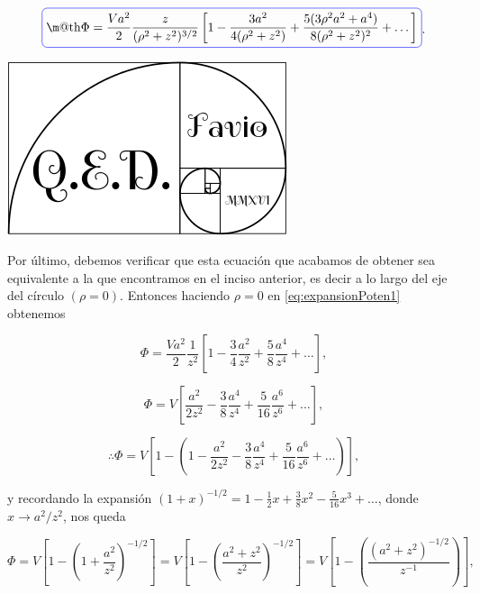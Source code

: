 \documentclass[a4paper,10pt]{article}
\makeatletter
\numberwithin{equation}{section}
\newcommand*{\boxcolor}{blue}
\renewcommand{\boxed}[1]{\textcolor{\boxcolor}{%
\tikz[baseline={([yshift=-1ex]current bounding box.center)}] \node [rectangle, minimum width=1ex,rounded corners,draw] {\normalcolor\m@th$\displaystyle#1$};}}
\makeatother
\begin{document}
\begin{equation}
 \boxed{\Phi = \frac{Va^2}{2}\frac{z}{(\rho^2 + z^2)^{3/2}}\left[1 - 
 \frac{3a^2}{4(\rho^2 + z^2)} + \frac{5(3\rho^2a^2+a^4)}{8(\rho^2 + z^2)^2} 
 + \dots \right]}.
 \label{eq:expansionPoten1}
\end{equation}

\hspace{10cm}\includegraphics[scale=0.2]{logoQED}

Por último, debemos verificar que esta ecuación que acabamos de obtener 
sea equivalente a la que encontramos en el inciso anterior, es decir 
a lo largo del eje del círculo $(\rho = 0)$. Entonces haciendo $\rho = 0$ 
en \eqref{eq:expansionPoten1} obtenemos 

\begin{equation}
 \Phi = \frac{Va^2}{2}\frac{1}{z^2}
 \left[1 - \frac{3}{4}\frac{a^2}{z^2} + 
 \frac{5}{8}\frac{a^4}{z^4} + \dots \right],
\end{equation}

\begin{equation}
 \Phi = V\left[\frac{a^2}{2z^2} - 
 \frac{3}{8}\frac{a^4}{z^4} + 
 \frac{5}{16}\frac{a^6}{z^6} + \dots \right],
\end{equation}

\begin{equation}
 \therefore \Phi = V\left[1 - \left(1 - \frac{a^2}{2z^2} - 
 \frac{3}{8}\frac{a^4}{z^4} + 
 \frac{5}{16}\frac{a^6}{z^6} + \dots  \right) \right],
\end{equation}

y recordando la expansión $(1 + x)^{-1/2} = 1 - \frac{1}{2}x + 
\frac{3}{8}x^2 - \frac{5}{16}x^3 + \dots$, donde $x \rightarrow a^2/z^2$, 
nos queda 

\begin{equation*}
 \Phi = V\left[1 - \left(1 + \frac{a^2}{z^2} \right)^{-1/2} \right] = 
 V\left[1 - \left(\frac{a^2+z^2}{z^2} \right)^{-1/2} \right] = 
 V\left[1 - \left(\frac{(a^2+z^2)^{-1/2}}{z^{-1}} \right) \right],
\end{equation*}
\end{document}
